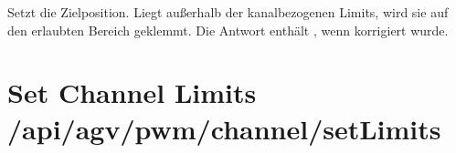 \documentclass[letterpaper,10pt,english]{sphinxmanual}
\begin{document}
\sphinxAtStartPar
{}
Setzt die Zielposition. Liegt  außerhalb der kanalbezogenen Limits, wird sie auf den erlaubten Bereich
geklemmt. Die Antwort enthält , wenn korrigiert wurde.

\sphinxAtStartPar
{}

\begin{sphinxVerbatim}[commandchars=\\\{\}]
\end{sphinxVerbatim}

\sphinxAtStartPar
{}

\begin{sphinxVerbatim}[commandchars=\\\{\}]
\end{sphinxVerbatim}


\section{Set Channel Limits \textendash{} /api/agv/pwm/channel/setLimits}
\label{\detokenize{agv_rest_api_pwm:set-channel-limits-api-agv-pwm-channel-setlimits}}\label{\detokenize{agv_rest_api_pwm:post-api-agv-pwm-channel-setlimits}}
\end{document}
